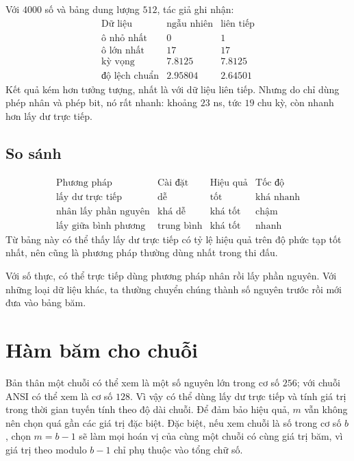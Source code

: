 \documentclass[11pt]{article}
\begin{document}
Với $4000$ số và bảng dung lượng $512$, tác giả ghi nhận:
\[
\begin{array}{lrr}
\text{Dữ liệu} & \text{ngẫu nhiên} & \text{liên tiếp}\\
\hline
\text{ô nhỏ nhất} & 0 & 1\\
\text{ô lớn nhất} & 17 & 17\\
\text{kỳ vọng} & 7.8125 & 7.8125\\
\text{độ lệch chuẩn} & 2.95804 & 2.64501
\end{array}
\]
Kết quả kém hơn tưởng tượng, nhất là với dữ liệu liên tiếp. Nhưng do chỉ dùng
phép nhân và phép bit, nó rất nhanh: khoảng $23$ ns, tức $19$ chu kỳ, còn
nhanh hơn lấy dư trực tiếp.

\subsection{So sánh}

\[
\begin{array}{llll}
\text{Phương pháp} & \text{Cài đặt} & \text{Hiệu quả} & \text{Tốc độ}\\
\hline
\text{lấy dư trực tiếp} & \text{dễ} & \text{tốt} & \text{khá nhanh}\\
\text{nhân lấy phần nguyên} & \text{khá dễ} & \text{khá tốt} & \text{chậm}\\
\text{lấy giữa bình phương} & \text{trung bình} & \text{khá tốt} & \text{nhanh}
\end{array}
\]
Từ bảng này có thể thấy lấy dư trực tiếp có tỷ lệ hiệu quả trên độ phức tạp
tốt nhất, nên cũng là phương pháp thường dùng nhất trong thi đấu.

Với số thực, có thể trực tiếp dùng phương pháp nhân rồi lấy phần nguyên. Với
những loại dữ liệu khác, ta thường chuyển chúng thành số nguyên trước rồi mới
đưa vào bảng băm.

\section{Hàm băm cho chuỗi}

Bản thân một chuỗi có thể xem là một số nguyên lớn trong cơ số $256$; với
chuỗi ANSI có thể xem là cơ số $128$. Vì vậy có thể dùng lấy dư trực tiếp và
tính giá trị trong thời gian tuyến tính theo độ dài chuỗi. Để đảm bảo hiệu
quả, $m$ vẫn không nên chọn quá gần các giá trị đặc biệt. Đặc biệt, nếu xem
chuỗi là số trong cơ số $b$, chọn $m=b-1$ sẽ làm mọi hoán vị của cùng một
chuỗi có cùng giá trị băm, vì giá trị theo modulo $b-1$ chỉ phụ thuộc vào tổng
chữ số.
\end{document}
